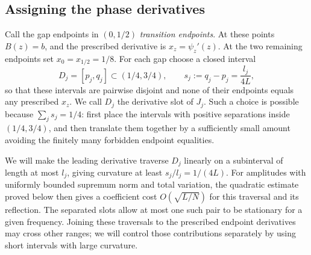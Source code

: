 \subsection{Assigning the phase derivatives}

Call the gap endpoints in $(0,1/2)$ \emph{transition endpoints}.  At these
points $B(z)=b$, and the prescribed derivative is $x_z=\psi_z'(z)$.
At the two remaining endpoints set $x_0=x_{1/2}=1/8$.
For each gap choose a closed interval
\[
 D_j=[p_j,q_j]\subset(1/4,3/4),
 \qquad s_j:=q_j-p_j=\frac{l_j}{4L},
\]
so that these intervals are pairwise disjoint and none of their endpoints
equals any prescribed $x_z$.  We call $D_j$ the derivative slot of $J_j$.
Such a choice is possible because $\sum_j s_j=1/4$: first place the
intervals with positive separations inside $(1/4,3/4)$, and then translate
them together by a sufficiently small amount avoiding the finitely many
forbidden endpoint equalities.

We will make the leading derivative traverse $D_j$ linearly on a subinterval of
length at most $l_j$, giving curvature at least $s_j/l_j=1/(4L)$.
For amplitudes with uniformly bounded supremum norm and total variation,
the quadratic estimate proved below
then gives a coefficient cost $O(\sqrt{L/N})$ for this traversal and its
reflection. The separated slots allow at most one such pair to be
stationary for a given frequency. Joining these traversals to the
prescribed endpoint derivatives may cross other ranges; we will control
those contributions separately by using short intervals with large curvature.


